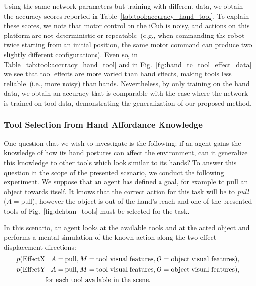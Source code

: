 Using the same network parameters but training with different data, we obtain the accuracy scores reported in Table~\ref{tab:tool:accuracy_hand_tool}.
To explain these scores, we note that motor control on the iCub is noisy, and actions on this platform are not deterministic or repeatable~(e.g., when commanding the robot twice starting from an initial position, the same motor command can produce two slightly different configurations).
Even so, in Table~\ref{tab:tool:accuracy_hand_tool} and in Fig.~\ref{fig:hand_to_tool_effect_data} we see that tool effects are more varied than hand effects, making tools less reliable~(i.e., more noisy) than hands.
Nevertheless, by only training on the hand data, we obtain an accuracy that is comparable with the case where the network is trained on tool data, demonstrating the generalization of our proposed method.

\subsubsection{Tool Selection from Hand Affordance Knowledge}

One question that we wish to investigate is the following: if an agent gains the knowledge of how its hand postures can affect the environment, can it generalize this knowledge to other tools which look similar to its hands?
To answer this question in the scope of the presented scenario, we conduct the following experiment.
We suppose that an agent has defined a goal, for example to pull an object towards itself.
It knows that the correct action for this task will be to \emph{pull} ($A = \text{pull}$), however the object is out of the hand's reach and one of the presented tools of Fig.~\ref{fig:dehban_tools} must be selected for the task.

In this scenario, an agent looks at the available tools and at the acted object and performs a mental simulation of the known action along the two effect displacement directions:
  \begin{align*}
    p(\text{EffectX} &\mid A=\text{pull}, M=\text{tool visual features}, O=\text{object visual features}), \\
    p(\text{EffectY} &\mid A=\text{pull}, M=\text{tool visual features}, O=\text{object visual features}), \\
               &\text{for each tool available in the scene}.
  \end{align*}

